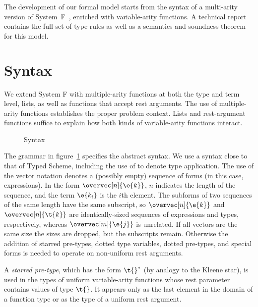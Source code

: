 \begin{schemeregion}

\label{sec:formal}



The development of our formal model starts from the syntax of a multi-arity version of
System~F~\cite{girard71}, enriched with variable-arity functions.
A technical
report~\cite{dots-tr} contains the full set of type rules as well as a semantics and soundness theorem for
this model.

\section{Syntax}

We extend System F with multiple-arity functions at both the type and term
 level, lists, as well as functions that accept rest arguments. The use of
 multiple-arity functions establishes the proper problem context.  Lists and
 rest-argument functions suffice to explain how both kinds of
 variable-arity functions interact.

\begin{figure}[t]
{\small{}}
\caption{Syntax\label{fig:dots-syntax}}
\end{figure}

The grammar in figure~\ref{fig:dots-syntax} specifies the abstract syntax. We use a syntax
close to that of Typed Scheme, including the use of \cinst{} to denote
type application.  The use of the vector notation \overvec{\e{}}
denotes a (possibly empty) sequence of forms (in this case,
expressions).  In the form $\overvec[n]{\e{k}}$, $n$ indicates the
length of the sequence, and the term $\e{k_i}$ is the $i$th element.
The subforms of two sequences of the same length have the same
subscript, so $\overvec[n]{\e{k}}$ and $\overvec[n]{\t{k}}$ are
identically-sized sequences of expressions and types, respectively,
whereas $\overvec[m]{\e{j}}$ is unrelated.  If all vectors are the
same size the sizes are dropped, but the subscripts remain. Otherwise the
addition of starred pre-types, dotted type variables, dotted
pre-types, and special forms is needed to operate on non-uniform
rest arguments.

A {\em starred pre-type}, which has the form $\starred{\t{}}$ (by
analogy to the Kleene star), is used in
the types of uniform variable-arity functions whose rest parameter
contains values of type $\t{}$.  It appears only  as the last element
in the domain of a function type or as the type of a uniform
rest argument.


\end{schemeregion}
